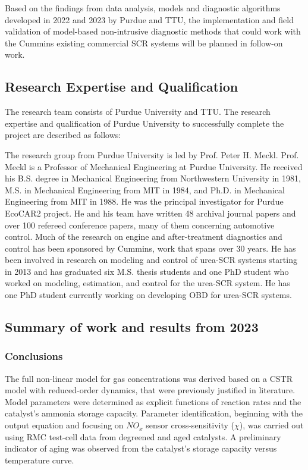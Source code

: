 Based on the findings from data analysis, models and diagnostic algorithms
developed in 2022 and 2023 by Purdue and TTU, the implementation and field
validation of model-based non-intrusive diagnostic methods that could work with
the Cummins existing commercial SCR systems will be planned in follow-on work.

\subsection{Research Expertise and Qualification}
The research team consists of Purdue University and TTU. The research expertise and qualification of Purdue University to successfully complete the project are described as follows:

The research group from Purdue University is led by Prof. Peter H. Meckl. Prof.
Meckl is a Professor of Mechanical Engineering at Purdue University. He
received his B.S. degree in Mechanical Engineering from Northwestern University
in 1981, M.S. in Mechanical Engineering from MIT in 1984, and Ph.D. in
Mechanical Engineering from MIT in 1988. He was the principal investigator for
Purdue EcoCAR2 project. He and his team have written 48 archival journal papers
and over 100 refereed conference papers, many of them concerning automotive
control. Much of the research on engine and after-treatment diagnostics and
control has been sponsored by Cummins, work that spans over 30 years. He has
been involved in research on modeling and control of urea-SCR systems starting
in 2013 and has graduated six M.S. thesis students and one PhD student who
worked on modeling, estimation, and control for the urea-SCR system. He has one
PhD student currently working on developing OBD for urea-SCR systems.



\subsection{Summary of work and results from 2023}








\subsubsection{Conclusions}
The full non-linear model for gas concentrations was derived based on a CSTR
model with reduced-order dynamics, that were previously justified in
literature. Model parameters were determined as explicit functions of reaction
rates and the catalyst's ammonia storage capacity.  Parameter identification,
beginning with the output equation and focusing on $NO_x$ sensor
cross-sensitivity ($\chi$), was carried out using RMC test-cell data from
degreened and aged catalysts. A preliminary indicator of aging was observed
from the catalyst's storage capacity versus temperature curve.
